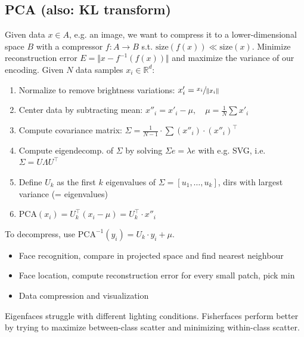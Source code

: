 \documentclass[a4paper,10pt]{article}
\begin{document}
\subsection{PCA (also: KL transform)}
Given data \( x \in A \), e.g. an image, we want to compress it to a lower-dimensional space \( B \) with a compressor \( f: A \to B \) s.t. \( \text{size}(f(x)) \ll \text{size}(x) \). Minimize reconstruction error \( E = \Vert x - f^{-1}(f(x)) \Vert \) and maximize the variance of our encoding. Given \( N \) data samples \( x_i \in \mathbb{R}^d \):
\begin{enumerate}
    \item Normalize to remove brightness variations: \( x'_i = \sfrac{x_i}{\Vert x_i\Vert} \)
    \item Center data by subtracting mean: \( x''_i = x'_i - \mu, \quad \mu = \frac{1}{N}\sum x'_i  \)
    \item Compute covariance matrix: \( \Sigma = \frac{1}{N-1}\cdot \sum (x''_i)\cdot (x''_i)^\top \)
    \item Compute eigendecomp. of \( \Sigma \) by solving \( \Sigma e = \lambda e \) with e.g. SVG, i.e. \( \Sigma = U \Lambda U^\top \)
    \item Define \( U_k \) as the first \( k \) eigenvalues of \( \Sigma = \left[u_{1}, \ldots, u_k\right] \), dirs with largest variance (= eigenvalues)
    \item \( \text{PCA}(x_i) = U^\top_k (x_i - \mu) = U^\top_k \cdot x''_i \)
\end{enumerate}
To decompress, use \( \text{PCA}^{-1}(y_i) = U_k\cdot y_i + \mu  \).
\begin{itemize}
    \item Face recognition, compare in projected space and find nearest neighbour
    \item Face location, compute reconstruction error for every small patch, pick min
    \item Data compression and visualization
\end{itemize}
Eigenfaces struggle with different lighting conditions. Fisherfaces perform better by trying to maximize between-class scatter and minimizing within-class scatter.
\end{document}
